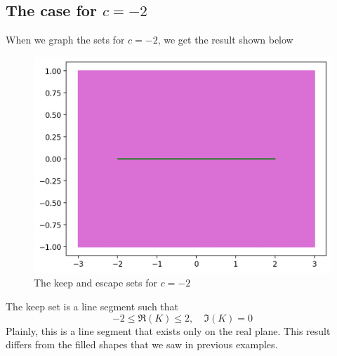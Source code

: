 \documentclass[12pt]{article}
\makeatletter
\DeclareRobustCommand{\abs}{\@ifstar\star@abs\normal@abs}
\newcommand{\star@abs}[1]{\left|#1\right|}
\newcommand{\normal@abs}[2][]{\mathopen{#1|}#2\mathclose{#1|}}
\makeatother
\begin{document}
\subsection{The case for $c = -2$}
When we graph the sets for $c=-2$, we get the result shown below
\begin{figure}[H]
	\centering
	\includegraphics[scale=0.6]{-2i0.png}
	\caption{The keep and escape sets for $c=-2$}
\end{figure}
The keep set is a line segment such that 
\[-2\leq\Re(K)\leq2,\quad\Im(K)=0\]
Plainly, this is a line segment that exists only on the real plane. This result differs from the filled shapes that we saw in previous examples.
\newpage
\end{document}
